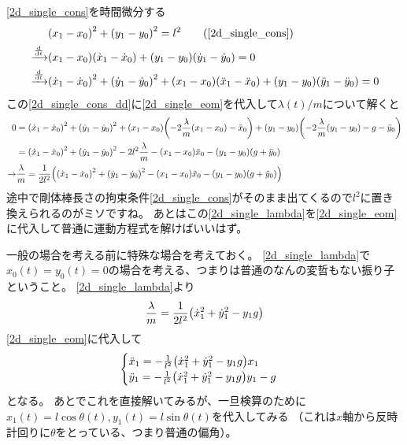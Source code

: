 \documentclass[uplatex]{jsarticle}
\begin{document}
\eqref{2d_single_cons}を時間微分する
\begin{align}
    &\qty(x_1 - x_0)^2 + \qty(y_1 - y_0)^2 = l^2 \tag{\ref{2d_single_cons}} \\
    \xrightarrow{\dv{}{t}}&
    \qty(x_1 - x_0) \qty(\dot{x}_1 - \dot{x}_0) + \qty(y_1 - y_0) \qty(\dot{y}_1 - \dot{y}_0) = 0 \\
    \xrightarrow{\dv{}{t}}&
    \qty(\dot{x}_1 - \dot{x}_0)^2 + \qty(\dot{y}_1 - \dot{y}_0)^2 
        + \qty(x_1 - x_0) \qty(\ddot{x}_1 - \ddot{x}_0) + \qty(y_1 - y_0) \qty(\ddot{y}_1 - \ddot{y}_0)= 0
        \label{2d_single_cons_dd}
\end{align}
この\eqref{2d_single_cons_dd}に\eqref{2d_single_eom}を代入して$\lambda(t)/m$について解くと
\begin{align}
    0 &= \qty(\dot{x}_1 - \dot{x}_0)^2 + \qty(\dot{y}_1 - \dot{y}_0)^2
        + \qty(x_1 - x_0)\qty(-2\frac{\lambda}{m}\qty(x_1 - x_0) - \ddot{x}_0)
        + \qty(y_1 - y_0)\qty(-2\frac{\lambda}{m}\qty(y_1 - y_0) - g - \ddot{y}_0) \nonumber \\
    &= \qty(\dot{x}_1 - \dot{x}_0)^2 + \qty(\dot{y}_1 - \dot{y}_0)^2
        -2 l^2 \frac{\lambda}{m}
        - \qty(x_1 - x_0) \ddot{x}_0
        - \qty(y_1 - y_0)\qty(g + \ddot{y}_0) \nonumber \\
    \rightarrow&
    \frac{\lambda}{m} = \frac{1}{2 l^2} \qty(
        \qty(\dot{x}_1 - \dot{x}_0)^2 + \qty(\dot{y}_1 - \dot{y}_0)^2
        - \qty(x_1 - x_0) \ddot{x}_0 - \qty(y_1 - y_0)\qty(g + \ddot{y}_0)
    ) \label{2d_single_lambda}
\end{align}
途中で剛体棒長さの拘束条件\eqref{2d_single_cons}がそのまま出てくるので$l^2$に置き換えられるのがミソですね。
あとはこの\eqref{2d_single_lambda}を\eqref{2d_single_eom}に代入して普通に運動方程式を解けばいいはず。

一般の場合を考える前に特殊な場合を考えておく。
\eqref{2d_single_lambda}で$x_0(t)=y_0(t)=0$の場合を考える、つまりは普通のなんの変哲もない振り子ということ。
\eqref{2d_single_lambda}より
\begin{align}
    \frac{\lambda}{m} = \frac{1}{2 l^2} \qty(\dot{x}_1^2 + \dot{y}_1^2 - y_1 g)
\end{align}
\eqref{2d_single_eom}に代入して
\begin{align}
\begin{cases}
    \ddot{x}_1 = -\frac{1}{l^2} \qty(\dot{x}_1^2 + \dot{y}_1^2 - y_1 g) x_1 \\
    \ddot{y}_1 = -\frac{1}{l^2} \qty(\dot{x}_1^2 + \dot{y}_1^2 - y_1 g) y_1 - g
\end{cases}
\end{align}
となる。
あとでこれを直接解いてみるが、一旦検算のために$x_1(t)=l\cos{\theta(t)}, y_1(t)=l\sin{\theta(t)}$を代入してみる
（これは$x$軸から反時計回りに$\theta$をとっている、つまり普通の偏角）。
\end{document}
